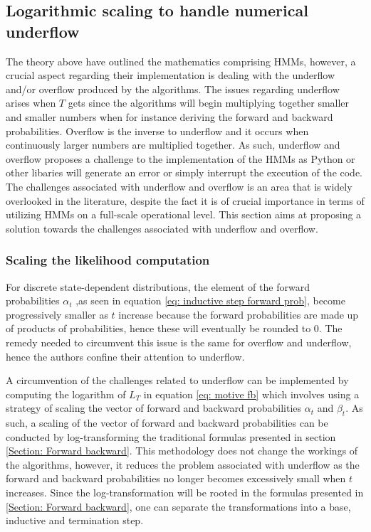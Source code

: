 \subsection{Logarithmic scaling to handle numerical underflow}
The theory above have outlined the mathematics comprising HMMs, however, a crucial aspect regarding their implementation is dealing with the underflow and/or overflow produced by the algorithms. The issues regarding underflow arises when $T$ gets since the algorithms will begin multiplying together smaller and smaller numbers when for instance deriving the forward and backward probabilities. Overflow is the inverse to underflow and it occurs when continuously larger numbers are multiplied together. As such, underflow and overflow proposes a challenge to the implementation of the HMMs as Python or other libaries will generate an error or simply interrupt the execution of the code. The challenges associated with underflow and overflow is an area that is widely overlooked in the literature, despite the fact it is of crucial importance in terms of utilizing HMMs on a full-scale operational level. This section aims at proposing a solution towards the challenges associated with underflow and overflow.

\subsubsection{Scaling the likelihood computation}
For discrete state-dependent distributions, the element of the forward probabilities $\alpha_t$ ,as seen in equation \ref{eq: inductive step forward prob}, become progressively smaller as $t$ increase because the forward probabilities are made up of products of probabilities, hence these will eventually be rounded to 0. The remedy needed to circumvent this issue is the same for overflow and underflow, hence the authors confine their attention to underflow.

A circumvention of the challenges related to underflow can be implemented by computing the logarithm of $L_T$ in equation \ref{eq: motive fb} which involves using a strategy of scaling the vector of forward and backward probabilities $\alpha_t$ and $\beta_t$. As such, a scaling of the vector of forward and backward probabilities can be conducted by log-transforming the  traditional formulas presented in section \ref{Section: Forward backward}. This methodology does not change the workings of the algorithms, however, it reduces the problem associated with underflow as the forward and backward probabilities no longer becomes excessively small when $t$ increases. Since the log-transformation will be rooted in the formulas presented in \ref{Section: Forward backward}, one can separate the transformations into a base, inductive and termination step.  

